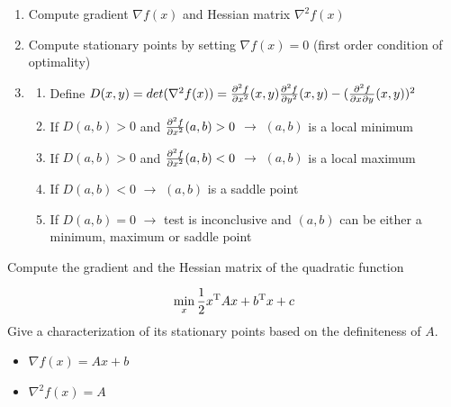 \documentclass[12pt,a4paper]{article}
\begin{document}
\begin{enumerate}
  \item Compute gradient $\nabla f(x)$ and Hessian matrix $\nabla^2 f(x)$
  \item Compute stationary points by setting $\nabla f(x) = 0$ (first order condition of optimality)
  \item \begin{enumerate}
    \item Define $D(x,y) = det(\nabla^2 f(x)) = \pd[2]{f}{x}(x,y)\pd[2]{f}{y}(x,y)-(\md{f}{2}{x}{}{y}{}(x,y))^2$
    \item If $D(a,b) > 0$ and $\pd[2]{f}{x}(a,b) > 0$ $\rightarrow$ $(a,b)$ is a local minimum
    \item If $D(a,b) > 0$ and $\pd[2]{f}{x}(a,b) < 0$ $\rightarrow$ $(a,b)$ is a local maximum
    \item If $D(a,b) < 0$ $\rightarrow$ $(a,b)$ is a saddle point
    \item If $D(a,b) = 0$ $\rightarrow$ test is inconclusive and $(a,b)$ can be either a minimum, maximum or saddle point
  \end{enumerate}
\end{enumerate}

\begin{question}
Compute the gradient and the Hessian matrix of the quadratic function

  \begin{equation*}
     \min_x \dfrac{1}{2} x^{\mathrm{T}} Ax + b^{\mathrm{T}}x + c
    \end{equation*}
    Give a characterization of its stationary points based on the definiteness of $A$.
\end{question}

\begin{itemize}
    \item $\nabla f(x) = Ax + b$
    \item $\nabla^2 f(x) = A$
\end{itemize}
\end{document}
